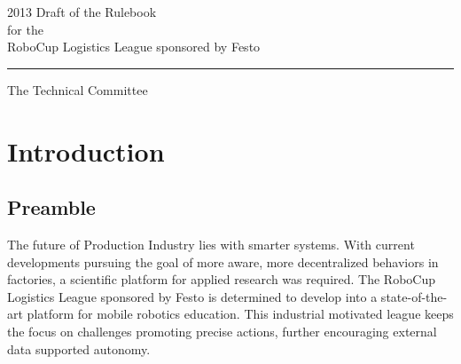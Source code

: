 \documentclass[12pt,twoside]{article}
\begin{document}


\begin{titlepage}
  \vspace*{5cm}
  \begin{center}
    \begin{LARGE}
      2013 Draft of the Rulebook\\[2ex]
      for the\\[2ex]
      RoboCup Logistics League sponsored by Festo\\[4ex]
    \end{LARGE}
    \hrule
    
    \vspace*{4ex}
    \begin{Large}
      The Technical Committee\\[6ex]
    \end{Large}
  \end{center}
  \vspace*{4cm}
  
\end{titlepage}
\thispagestyle{empty}
\pagebreak
\cleardoublepage

\setcounter{page}{1}
\tableofcontents
\newpage
\cleardoublepage

\setcounter{page}{1}

\section{Introduction} \label{sec:intro}

\subsection*{Preamble} \label{sec:preamble}

The future of Production Industry lies with smarter systems.  With
current developments pursuing the goal of more aware, more
decentralized behaviors in factories, a scientific platform for
applied research was required.  The RoboCup Logistics League sponsored
by Festo is determined to develop into a state-of-the-art
platform for mobile robotics education. This industrial motivated
league keeps the focus on challenges promoting precise actions,
further encouraging external data supported autonomy.
\end{document}
